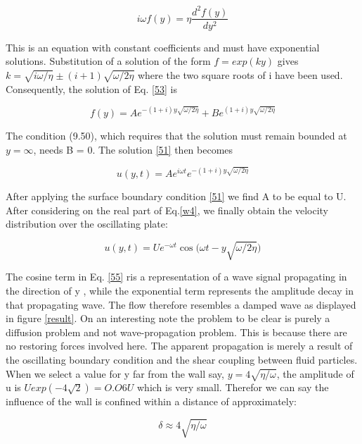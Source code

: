 \documentclass[paper=a4, fontsize=11pt, abstract=on]{scrartcl}
\numberwithin{equation}{section}		%
\numberwithin{figure}{section}			%
\numberwithin{table}{section}				%
\begin{document}
\begin{equation}
\label{52}
i\omega f(y) = \eta \frac{d^2f(y)}{dy^2}
\end{equation}

This is an equation with constant coefficients and must have exponential solutions. Substitution of a solution of the form $f = exp(ky)$ gives $k = \sqrt{i\omega / \eta} \pm(i+1) \sqrt{\omega /2 \eta}$ where the two square roots of i have been used. Consequently, the solution of Eq. \ref{53} is


\begin{equation}
\label{53}
f(y) = Ae^{-(1+i)y\sqrt{\omega/2\eta}}+Be^{(1+i)y\sqrt{\omega/2\eta}}
\end{equation}


The condition (9.50), which requires that the solution must remain bounded at $y = \infty$, needs B = 0. The solution \ref{51} then becomes

\begin{equation}
\label{54}
u(y,t) = Ae^{i\omega t}e^{-(1+i)y\sqrt{\omega/2\eta}}
\end{equation}


After applying the surface boundary condition \ref{51} we find A to be equal to U. After considering on the real part of Eq.\ref{w4}, we finally obtain the velocity distribution over the oscillating plate:

\begin{equation}
\label{55}
u(y,t) = Ue^{-\omega t}\cos\Big(\omega t - y\sqrt{\omega/2\eta}\Big)
\end{equation}

The cosine term in Eq. \ref{55} ris a representation of a wave signal propagating in the direction of y , while the exponential term represents the amplitude decay in that propagating wave. The flow therefore resembles a damped wave as displayed in figure \ref{result}. On an interesting note the problem to be clear is purely a diffusion problem and not wave-propagation problem. This is because there are no restoring forces involved here. The apparent propagation is merely a result of the oscillating boundary condition and the shear coupling between fluid particles. When we select a value for y far from the wall say, $y = 4\sqrt{\eta/\omega}$, the amplitude of u is $U exp(-4\sqrt{2}) = O.O6U$ which is very small. Therefor we can say the influence of the wall is confined within a distance of approximately:


\begin{equation}
\label{56}
\delta \approx 4\sqrt{\eta/\omega}
\end{equation}
\end{document}
